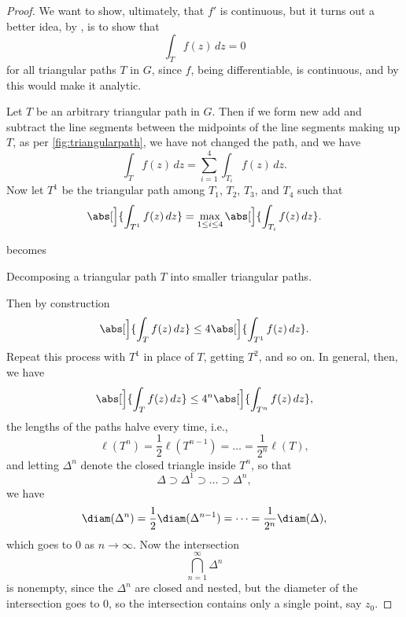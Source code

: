 \begin{proof}
	We want to show, ultimately, that $f'$ is continuous, but it turns out a better idea, by , is to show that
	\[
		\int_T f(z) \, d z = 0
	\]
	for all triangular paths $T$ in $G$, since $f$, being differentiable, is continuous, and by  this would make it analytic.

	Let $T$ be an arbitrary triangular path in $G$.
	Then if we form new add and subtract the line segments between the midpoints of the line segments making up $T$, as per \autoref{fig:triangularpath}, we have not changed the path, and we have
	\[
		\int_T f(z) \, d z = \sum_{i = 1}^4 \int_{T_i} f(z) \, d z.
	\]
	Now let $T^1$ be the triangular path among $T_1$, $T_2$, $T_3$, and $T_4$ such that
	\[
		\abs[\Big]{\int_{T^1} f(z) \, d z} = \max_{1 \leq i \leq 4} \abs[\Big]{\int_{T_i} f(z) \, d z}.
	\]

	\begin{marginfigure}
		\centering

		becomes


		\caption{\label{fig:triangularpath} Decomposing a triangular path $T$ into smaller triangular paths.}
	\end{marginfigure}

	Then by construction
	\[
		\abs[\Big]{\int_T f(z) \, d z} \leq 4 \abs[\Big]{\int_{T^1} f(z) \, d z}.
	\]
	Repeat this process with $T^1$ in place of $T$, getting $T^2$, and so on.
	In general, then, we have
	\[
		\abs[\Big]{\int_T f(z) \, d z} \leq 4^n \abs[\Big]{\int_{T^n} f(z) \, d z},
	\]
	the lengths of the paths halve every time, i.e.,
	\[
		\ell(T^n) = \frac{1}{2} \ell(T^{n - 1}) = \dots = \frac{1}{2^n} \ell(T),
	\]
	and letting $\Delta^n$ denote the closed triangle inside $T^n$, so that
	\[
		\Delta \supset \Delta^1 \supset \dots \supset \Delta^n,
	\]
	we have
	\[
		\diam(\Delta^n) = \frac{1}{2} \diam(\Delta^{n - 1}) = \dots = \frac{1}{2^n} \diam(\Delta),
	\]
	which goes to $0$ as $n \to \infty$.
	Now the intersection
	\[
		\bigcap_{n = 1}^\infty \Delta^n
	\]
	is nonempty, since the $\Delta^n$ are closed and nested, but the diameter of the intersection goes to $0$, so the intersection contains only a single point, say $z_0$.


\end{proof}
